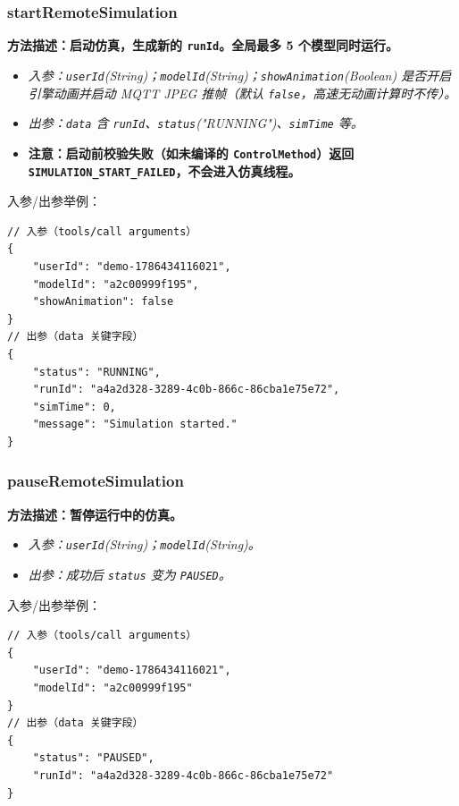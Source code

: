 \subsubsection{startRemoteSimulation}
\bf{方法描述}：启动仿真，生成新的 \texttt{runId}。全局最多 5 个模型同时运行。
\begin{itemize}
	\item \it{入参}：\texttt{userId}(String)；\texttt{modelId}(String)；\texttt{showAnimation}(Boolean) 是否开启引擎动画并启动 MQTT JPEG 推帧（默认 \texttt{false}，高速无动画计算时不传）。
	\item \it{出参}：\texttt{data} 含 \texttt{runId}、\texttt{status}("RUNNING")、\texttt{simTime} 等。
	\item \bf{注意}：启动前校验失败（如未编译的 \texttt{ControlMethod}）返回 \texttt{SIMULATION\_START\_FAILED}，不会进入仿真线程。
\end{itemize}
入参/出参举例：
\begin{lstlisting}
// 入参（tools/call arguments）
{
    "userId": "demo-1786434116021",
    "modelId": "a2c00999f195",
    "showAnimation": false
}
// 出参（data 关键字段）
{
    "status": "RUNNING",
    "runId": "a4a2d328-3289-4c0b-866c-86cba1e75e72",
    "simTime": 0,
    "message": "Simulation started."
}
\end{lstlisting}\vspace{-30pt}

\subsubsection{pauseRemoteSimulation}
\bf{方法描述}：暂停运行中的仿真。
\begin{itemize}
	\item \it{入参}：\texttt{userId}(String)；\texttt{modelId}(String)。
	\item \it{出参}：成功后 \texttt{status} 变为 \texttt{PAUSED}。
\end{itemize}
入参/出参举例：
\begin{lstlisting}
// 入参（tools/call arguments）
{
    "userId": "demo-1786434116021",
    "modelId": "a2c00999f195"
}
// 出参（data 关键字段）
{
    "status": "PAUSED",
    "runId": "a4a2d328-3289-4c0b-866c-86cba1e75e72"
}
\end{lstlisting}\vspace{-30pt}

